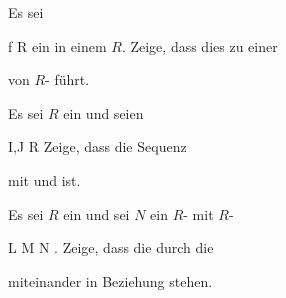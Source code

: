 {}
{





Es sei

\mavergleichskette
{\vergleichskette
{ f
}
{ \in }{ R
}
{  }{
}
{    }{
}
{   }{
}
}
{}{}{}
ein
in einem
$R$. Zeige, dass dies zu einer

 {  }

von
$R$-
führt.





}
{} {}

{}
{





Es sei $R$ ein
und seien

\mavergleichskette
{\vergleichskette
{ I,J
}
{ \subseteq }{ R
}
{  }{
}
{    }{
}
{   }{
}
}
{}{}{}
Zeige, dass die Sequenz

 {  }

mit
 und
ist.





}
{} {}

{}
{





Es sei $R$ ein
und sei $N$ ein
$R$-
mit
$R$-

\mavergleichskette
{\vergleichskette
{ L
}
{ \subseteq }{ M
}
{ \subseteq }{ N
}
{    }{
}
{   }{
}
}
{}{}{.}
Zeige, dass die
durch die

 {  }

miteinander in Beziehung stehen.





}
{} {}

